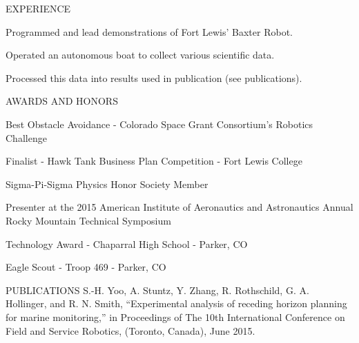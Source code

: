 \documentclass{resume} %
\begin{document}
\begin{newSection}{EXPERIENCE}
    \begin{myList}
        \item Programmed and lead demonstrations of Fort Lewis' Baxter Robot.
        \item Operated an autonomous boat to collect various scientific data.
        \item Processed this data into results used in publication (see publications). 
    \end{myList}

\end{newSection} 
\vspace{3mm}

\begin{newSection}{AWARDS AND HONORS}
\begin{myList}
    \item Best Obstacle Avoidance - Colorado Space Grant Consortium's Robotics Challenge
    \item Finalist - Hawk Tank Business Plan Competition - Fort Lewis College
    \item Sigma-Pi-Sigma Physics Honor Society Member
    \item Presenter at the 2015 American Institute of Aeronautics and Astronautics Annual Rocky Mountain Technical Symposium
    \item Technology Award - Chaparral High School - Parker, CO
    \item Eagle Scout - Troop 469 - Parker, CO
\end{myList}
\end{newSection}
\vspace{3.5mm}

\begin{newSection}{PUBLICATIONS}
    S.-H. Yoo, A. Stuntz, Y. Zhang, R. Rothschild, G. A. Hollinger, and R. N. Smith, “Experimental analysis of receding horizon planning for marine monitoring,” in Proceedings of The 10th International Conference on Field and Service Robotics, (Toronto, Canada), June 2015.
\end{newSection}
\vspace{3.5mm}

\end{document}
